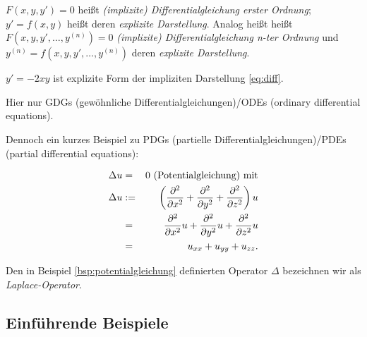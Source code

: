 \documentclass[10pt]{scrbook}
\begin{document}
\begin{Def}
$F(x, y, y')=0$ heißt \emph{(implizite) Differentialgleichung erster Ordnung}; $y'=f(x, y)$ heißt deren \emph{explizite Darstellung}. Analog heißt heißt $F(x, y, y', \ldots, y^{(n)})=0$ \emph{(implizite) Differentialgleichung n-ter Ordnung} und  $y^{(n)}=f(x, y, y', \ldots,  y^{(n)})$ deren \emph{explizite Darstellung}.
\end{Def}

\begin{Bsp}
$y'=-2 x y$ ist explizite Form der impliziten Darstellung \eqref{eq:diff}.
\end{Bsp}

Hier nur GDGs (gewöhnliche Differentialgleichungen)/ODEs (ordinary differential equations).

Dennoch ein kurzes Beispiel zu PDGs (partielle Differentialgleichungen)/PDEs (partial differential equations):

\begin{Bsp}
\label{bsp:potentialgleichung}
\begin{eqnarray*}
\Delta u & = & 0 \textnormal{ (Potentialgleichung) mit}\\
\Delta u & := & \left(\frac{\partial^2}{\partial x^2} + \frac{\partial^2}{\partial y^2} + \frac{\partial^2}{\partial z^2}\right) u  \\
& = & \frac{\partial^2}{\partial x^2} u + \frac{\partial^2}{\partial y^2} u + \frac{\partial^2}{\partial z^2} u \\
& = & u_{x x}+u_{y y}+u_{z z}.
\end{eqnarray*}
\end{Bsp}

\begin{Bem}
Den in Beispiel \ref{bsp:potentialgleichung} definierten Operator $\Delta$ bezeichnen wir als \emph{Laplace-Operator}.
\end{Bem}

\subsection{Einführende Beispiele}
\end{document}
